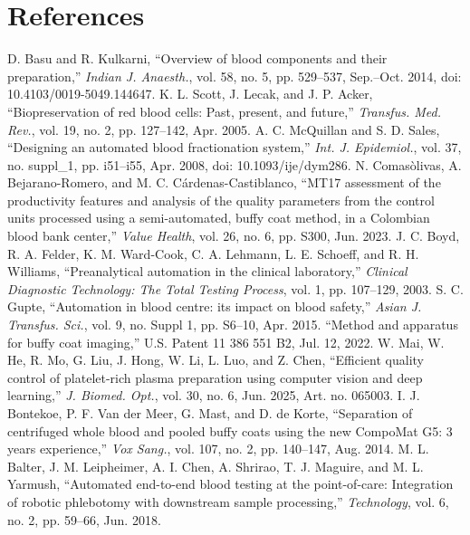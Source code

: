 \section*{References}

\begin{thebibliography}{00}

 D. Basu and R. Kulkarni, ``Overview of blood components and their preparation,'' {\it Indian J. Anaesth.}, vol. 58, no. 5, pp. 529--537, Sep.--Oct. 2014, doi: 10.4103/0019-5049.144647.
 K. L. Scott, J. Lecak, and J. P. Acker, ``Biopreservation of red blood cells: Past, present, and future,'' {\it Transfus. Med. Rev.}, vol. 19, no. 2, pp. 127--142, Apr. 2005.
 A. C. McQuillan and S. D. Sales, ``Designing an automated blood fractionation system,'' {\it Int. J. Epidemiol.}, vol. 37, no. suppl\_1, pp. i51--i55, Apr. 2008, doi: 10.1093/ije/dym286.
 N. Comasòlivas, A. Bejarano-Romero, and M. C. Cárdenas-Castiblanco, ``MT17 assessment of the productivity features and analysis of the quality parameters from the control units processed using a semi-automated, buffy coat method, in a Colombian blood bank center,'' {\it Value Health}, vol. 26, no. 6, pp. S300, Jun. 2023.
 J. C. Boyd, R. A. Felder, K. M. Ward-Cook, C. A. Lehmann, L. E. Schoeff, and R. H. Williams, ``Preanalytical automation in the clinical laboratory,'' {\it Clinical Diagnostic Technology: The Total Testing Process}, vol. 1, pp. 107--129, 2003.
 S. C. Gupte, ``Automation in blood centre: its impact on blood safety,'' {\it Asian J. Transfus. Sci.}, vol. 9, no. Suppl 1, pp. S6--10, Apr. 2015.
 ``Method and apparatus for buffy coat imaging,'' U.S. Patent 11 386 551 B2, Jul. 12, 2022.
 W. Mai, W. He, R. Mo, G. Liu, J. Hong, W. Li, L. Luo, and Z. Chen, ``Efficient quality control of platelet-rich plasma preparation using computer vision and deep learning,'' {\it J. Biomed. Opt.}, vol. 30, no. 6, Jun. 2025, Art. no. 065003.
 I. J. Bontekoe, P. F. Van der Meer, G. Mast, and D. de Korte, ``Separation of centrifuged whole blood and pooled buffy coats using the new CompoMat G5: 3 years experience,'' {\it Vox Sang.}, vol. 107, no. 2, pp. 140--147, Aug. 2014.
 M. L. Balter, J. M. Leipheimer, A. I. Chen, A. Shrirao, T. J. Maguire, and M. L. Yarmush, ``Automated end-to-end blood testing at the point-of-care: Integration of robotic phlebotomy with downstream sample processing,'' {\it Technology}, vol. 6, no. 2, pp. 59--66, Jun. 2018.

\end{thebibliography}
